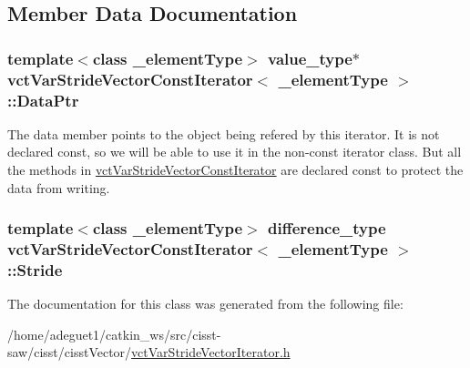 \subsection{Member Data Documentation}
\hypertarget{classvct_var_stride_vector_const_iterator_a0aed102854d3d3a2c15214f55640c1b2}{
\subsubsection[{Data\-Ptr}]{\setlength{\rightskip}{0pt plus 5cm}template$<$class \-\_\-element\-Type$>$ value\-\_\-type$\ast$ {\bf vct\-Var\-Stride\-Vector\-Const\-Iterator}$<$ \-\_\-element\-Type $>$\-::Data\-Ptr\hspace{0.3cm}{\ttfamily [protected]}}}\label{classvct_var_stride_vector_const_iterator_a0aed102854d3d3a2c15214f55640c1b2}
The data member points to the object being refered by this iterator. It is not declared const, so we will be able to use it in the non-\/const iterator class. But all the methods in \hyperlink{classvct_var_stride_vector_const_iterator}{vct\-Var\-Stride\-Vector\-Const\-Iterator} are declared const to protect the data from writing. \hypertarget{classvct_var_stride_vector_const_iterator_a0b2bb6ca56af29cbf73c6874e86c367e}{
\subsubsection[{Stride}]{\setlength{\rightskip}{0pt plus 5cm}template$<$class \-\_\-element\-Type$>$ difference\-\_\-type {\bf vct\-Var\-Stride\-Vector\-Const\-Iterator}$<$ \-\_\-element\-Type $>$\-::Stride\hspace{0.3cm}{\ttfamily [protected]}}}\label{classvct_var_stride_vector_const_iterator_a0b2bb6ca56af29cbf73c6874e86c367e}


The documentation for this class was generated from the following file\-:\begin{DoxyCompactItemize}
\item 
/home/adeguet1/catkin\-\_\-ws/src/cisst-\/saw/cisst/cisst\-Vector/\hyperlink{vct_var_stride_vector_iterator_8h}{vct\-Var\-Stride\-Vector\-Iterator.\-h}\end{DoxyCompactItemize}

